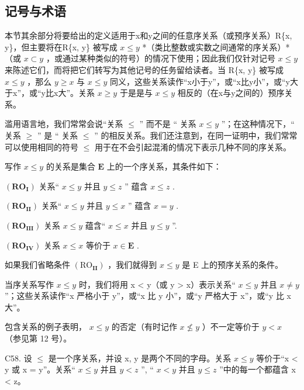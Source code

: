 \subsection{记号与术语}

本节其余部分将要给出的定义适用于x和y之间的任意序关系（或预序关系）R\{x, y\}，但主要将在R\{x, y\} 被写成 \(x \leqslant y\) *（类比整数或实数之间通常的序关系）*（或 \(x \subset y\) ，或通过某种类似的符号）的情况下使用；因此我们仅针对记号 \(x \leqslant y\) 来陈述它们，而将把它们转写为其他记号的任务留给读者。当 R\{x, y\} 被写成 \(x \leqslant y\) ，那么 \(y \geqslant x\) 与 \(x \leqslant y\) 同义，这些关系读作“x小于y”，或“x比y小”，或“y大于x”，或“y比x大”。关系 \(x \geqslant y\) 于是是与 \(x \leqslant y\) 相反的（在x与y之间的）预序关系。

滥用语言地，我们常常会说“关系 \(\leqslant\) '' 而不是 `` 关系 \(x \leqslant y\) ''；在这种情况下，`` 关系 \(\geqslant\) '' 是 `` 关系 \(\leqslant\) '' 的相反关系。我们还注意到，在同一证明中，我们常常可以使用相同的符号 \(\leqslant\) 用于在不会引起混淆的情况下表示几种不同的序关系。

写作 \(x \leqslant y\) 的关系是集合 \(\mathbf{E}\) 上的一个序关系，其条件如下：

\((\mathbf{RO}_{\mathbf{I}})\) 关系“ \(x \leqslant y\) 并且 \(y \leqslant z\) '' 蕴含 \(x \leqslant z\) .

\((\mathbf{RO}_{\mathbf{II}})\) 关系“ \(x \leqslant y\) 并且 \(y \leqslant x\) '' 蕴含 \(x = y\) .

\((\mathbf{RO}_{\mathbf{III}})\) 关系 \(x \leqslant y\) 蕴含“ \(x \leqslant x\) 并且 \(y \leqslant y\) ''.

\((\mathbf{RO}_{\mathbf{IV}})\) 关系 \(x \leqslant x\) 等价于 \(x \in \mathbf{E}\) .

如果我们省略条件 \((\mathrm{RO}_{\mathbf{II}})\) ，我们就得到 \(x \leqslant y\) 是 E 上的预序关系的条件。

当序关系写作 \(x \leqslant y\) 时，我们将用 x \textless{} y（或 y \textgreater{} x）表示关系“ \(x \leqslant y\) 并且 \(x \neq y\) ”；这些关系读作“x 严格小于 y”，或“x 比 y 小”，或“y 严格大于 x”，或“y 比 x 大”。

包含关系的例子表明， \(x \leqslant y\) 的否定（有时记作 \(x \nleqslant y\) ）不一定等价于 \(y < x\) （参见第 12 号）。

C58. 设 \(\leqslant\) 是一个序关系，并设 x, y 是两个不同的字母。关系 \(x \leqslant y\) 等价于“x \textless{} y 或 x = y”。关系“ \(x \leqslant y\) 并且 \(y < z\) '', `` \(x < y\) 并且 \(y \leqslant z\) ”中的每一个都蕴含 x \textless{} z。

